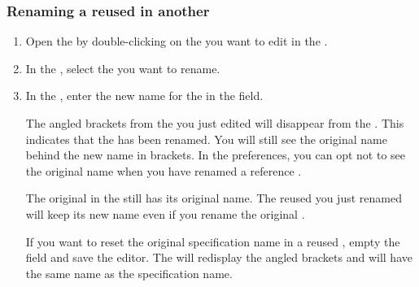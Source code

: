 \subsubsection{Renaming a \gdcase{} reused in another \gdcase{}}
\begin{enumerate}
\item Open the \gdtestcaseeditor{} by double-clicking on the \gdcase{} you want to edit in the \gdtestcasebrowser{}. 
\item In the \gdtestcaseeditor{}, select the \gdcase{} you want to rename.
\item In the \gdpropview{}, enter the new name for the \gdcase{} in the  field. 

The angled brackets from the \gdcase{} you just edited will disappear from the \gdtestcaseeditor{}. This indicates that the \gdcase{} has been renamed. You will still see the original \gdcase{} name behind the new name in brackets. In the preferences, you can opt not to see the original name when you have renamed a \gdcase{} reference . 

The original \gdcase{} in the \gdtestcasebrowser{} still has its original name. The reused \gdcase{} you just renamed will keep its new name even if you rename the original \gdcase{}. 

If you want to reset the original specification name in a reused \gdcase{}, empty the  field and save the editor. The \gdcase{} will redisplay the angled brackets and will have the same name as the specification name.  
\end{enumerate}

